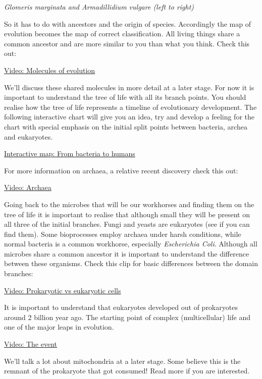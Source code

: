 \documentclass[11pt]{article}
\begin{document}
\emph{Glomeris marginata and Armadillidium vulgare (left to right)}

So it has to do with ancestors and the origin of species. Accordingly
the map of evolution becomes the map of correct classification. All
living things share a common ancestor and are more similar to you than
what you think. Check this out:

\href{https://www.youtube.com/watch?v=nvJFI3ChOUU}{Video: Molecules of
evolution}

We'll discuss these shared molecules in more detail at a later stage.
For now it is important to understand the tree of life with all its
branch points. You should realise how the tree of life represents a
timeline of evolutionary development. The following interactive chart
will give you an idea, try and develop a feeling for the chart with
special emphasis on the initial split points between bacteria, archea
and eukaryotes.

\href{https://www.evogeneao.com/explore/tree-of-life-explorer\#waterbirds}{Interactive
map: From bacteria to humans}

For more information on archaea, a relative recent discovery check this
out:

\href{https://www.youtube.com/watch?v=0W-uItr5M4g}{Video: Archaea}

Going back to the microbes that will be our workhorses and finding them
on the tree of life it is important to realise that although small they
will be present on all three of the initial branches. Fungi and yeasts
are eukaryotes (see if you can find them). Some bioprocesses employ
archaea under harsh conditions, while normal bacteria is a common
workhorse, especially \emph{Escherichia Coli}. Although all microbes
share a common ancestor it is important to understand the difference
between these organisms. Check this clip for basic differences between
the domain branches:

\href{https://www.youtube.com/watch?v=RQ-SMCmWB1s}{Video: Prokaryotic vs
eukaryotic cells}

It is important to understand that eukaryotes developed out of
prokaryotes around 2 billion year ago. The starting point of complex
(multicellular) life and one of the major leaps in evolution.

\href{https://www.youtube.com/watch?v=q71DWYJD-dI}{Video: The event}

We'll talk a lot about mitochondria at a later stage. Some believe this
is the remnant of the prokaryote that got consumed! Read more if you are
interested.
\end{document}

